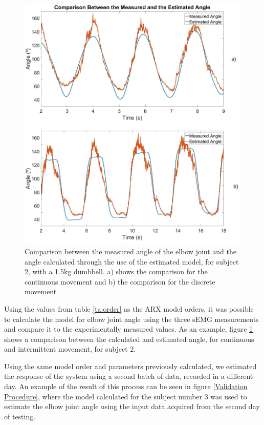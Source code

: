 \documentclass[letterpaper, 10 pt, conference]{ieeeconf}  %
\begin{document}
\begin{figure}[thpb]
      \centering
      \includegraphics[width=\columnwidth]{Images/comparison.jpg}
      \caption{Comparison between the measured angle of the elbow joint and the angle calculated through the use of the estimated model, for subject 2, with a 1.5kg dumbbell. a) shows the comparison for the continuous movement and b) the comparison for the discrete movement}
      \label{Angle Comparison}
   \end{figure}
   


Using the values from table \ref{ta:order} as the ARX model orders, it was possible to calculate the model for elbow joint angle using the three sEMG measurements and compare it to the experimentally measured values. As an example, figure \ref{Angle Comparison} shows a comparison between the calculated and estimated angle, for continuous and intermittent movement, for subject 2.

Using the same model order and parameters previously calculated, we estimated the response of the system using a second batch of data, recorded in a different day. An example of the result of this process can be seen in figure \ref{Validation Procedure}, where the model calculated for the subject number 3 was used to estimate the elbow joint angle using the input data acquired from the second day of testing.
\end{document}
